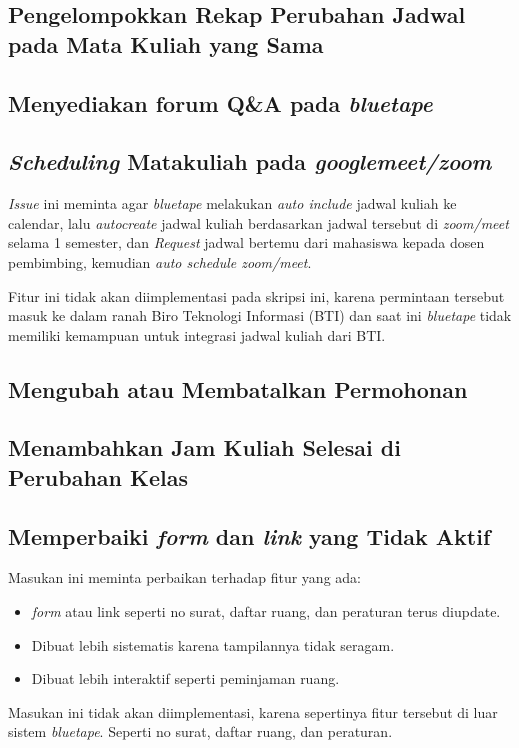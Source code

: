 \subsection{Pengelompokkan Rekap Perubahan Jadwal pada Mata Kuliah yang Sama}
\subsection{Menyediakan forum Q\&A pada \textit{bluetape}}
\subsection{\textit{Scheduling} Matakuliah pada \textit{googlemeet/zoom}}
\textit{Issue} ini meminta agar \textit{bluetape} melakukan \textit{auto include} jadwal kuliah ke calendar, lalu \textit{autocreate} jadwal kuliah berdasarkan jadwal tersebut di \textit{zoom/meet} selama 1 semester, dan \textit{Request} jadwal bertemu dari mahasiswa kepada dosen pembimbing, kemudian \textit{auto schedule zoom/meet}.

Fitur ini tidak akan diimplementasi pada skripsi ini, karena permintaan tersebut masuk ke dalam ranah Biro Teknologi Informasi (BTI) dan saat ini \textit{bluetape} tidak memiliki kemampuan untuk integrasi jadwal kuliah dari BTI.

\subsection{Mengubah atau Membatalkan Permohonan}
\subsection{Menambahkan Jam Kuliah Selesai di Perubahan Kelas}

\subsection{Memperbaiki \textit{form} dan \textit{link} yang Tidak Aktif}
Masukan ini meminta perbaikan terhadap fitur yang ada: 
\begin{itemize}
	\item \textit{form} atau link seperti no surat, daftar ruang, dan peraturan terus diupdate.
	\item Dibuat lebih sistematis karena tampilannya tidak seragam.
	\item Dibuat lebih interaktif seperti peminjaman ruang.
\end{itemize}   

Masukan ini tidak akan diimplementasi, karena sepertinya fitur tersebut di luar sistem \textit{bluetape}. Seperti no surat, daftar ruang, dan peraturan.

